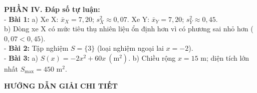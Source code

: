 \documentclass[10pt,a4paper]{article}
\begin{document}
\vspace{5pt}
\noindent\textbf{PHẦN IV. Đáp số tự luận:}\\[2pt]
- \textbf{Bài 1:} a) Xe X: $\bar{x}_X = 7{,}20$; $s_X^2 \approx 0{,}07$. Xe Y: $\bar{x}_Y = 7{,}20$; $s_Y^2 \approx 0{,}45$.\\
 b) Dòng xe X có mức tiêu thụ nhiên liệu ổn định hơn vì có phương sai nhỏ hơn ($0{,}07 < 0{,}45$).\\
- \textbf{Bài 2:} Tập nghiệm $S = \{3\}$ (loại nghiệm ngoại lai $x = -2$).\\
- \textbf{Bài 3:} a) $S(x) = -2x^2 + 60x\ (\text{m}^2)$. b) Chiều rộng $x = 15\text{ m}$; diện tích lớn nhất $S_{\max} = 450\text{ m}^2$.

\vspace{4pt}
\begin{center}
  {\large\bfseries\color{ink} HƯỚNG DẪN GIẢI CHI TIẾT}
\end{center}
\vspace{1pt}
\end{document}
